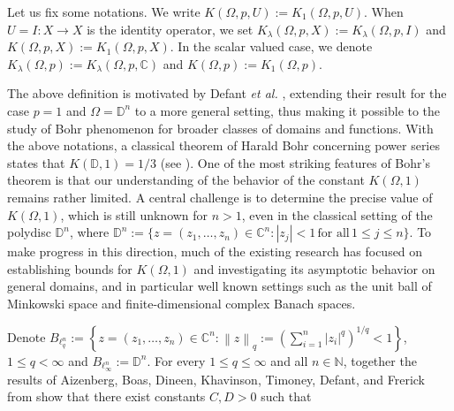 \documentclass[a4paper,11pt, reqno]{amsart}
\theoremstyle{definition}
\newcounter {own}
\newcommand{\norm}[1]{\left\lVert#1\right\rVert}
\begin{document}
	Let us fix some notations. We write $K(\Omega, p,U):=K_{1}(\Omega, p,U)$. When $U=I:X\rightarrow X$ is the identity operator, we set $K_{\lambda}(\Omega, p,X):=K_{\lambda}(\Omega, p,I)$ and $K(\Omega, p,X):=K_{1}(\Omega, p,X)$. In the scalar valued case, we denote $K_{\lambda}(\Omega, p):=K_{\lambda}(\Omega, p,\mathbb{C})$ and $K(\Omega,p):=K_1(\Omega,p)$.
	\vspace{1mm}
	  
	The above definition is motivated by Defant {\it et al.} \cite{defant-2012}, extending their result for the case $p=1$ and $\Omega=\mathbb{D}^n$ to a more general setting, thus making it possible to the study of Bohr phenomenon for broader classes of domains and functions. 
	With the above notations, a classical theorem of Harald Bohr concerning power series states that $K(\mathbb{D},1)=1/3$ (see \cite{Bohr-1914}). %
	One of the most striking features of Bohr's theorem is that our understanding of the behavior of the constant $K(\Omega,1)$ remains rather limited. A central challenge is to determine the precise value of $K(\Omega,1)$, which is still unknown for $n>1$, even in the classical setting of the polydisc $\mathbb{D}^n$, where $\mathbb{D}^n:=\{z=(z_{1},\ldots,z_{n}) \in \mathbb{C}^n: |z_{j}|<1\, \mbox{for all}\, 1 \leq j \leq n\}$. To make progress in this direction, much of the existing research has focused on establishing bounds for $K(\Omega,1)$ and investigating its asymptotic behavior on general domains, and in particular well known settings such as the unit ball of Minkowski space and finite-dimensional complex Banach spaces. 
	\par
	Denote $B_{\ell^n _q}:=\left\{z=(z_{1},\ldots,z_{n}) \in \mathbb{C}^n:\norm{z}_{q}:=\left(\sum_{i=1}^{n}|z_{i}|^q\right)^{1/q}<1\right\}$, $1\leq q <\infty$ and $B_{\ell^n _\infty}:=\mathbb{D}^n$. For every $1\leq q \leq \infty$ and all $n\in \mathbb{N}$, together the results of Aizenberg, Boas, Dineen, Khavinson, Timoney, Defant, and Frerick from \cite{aizn-2000a,boas-1997,boas-2000,defant-2011-lpn} show that  there exist constants $C,D>0$ such that 
\end{document}
